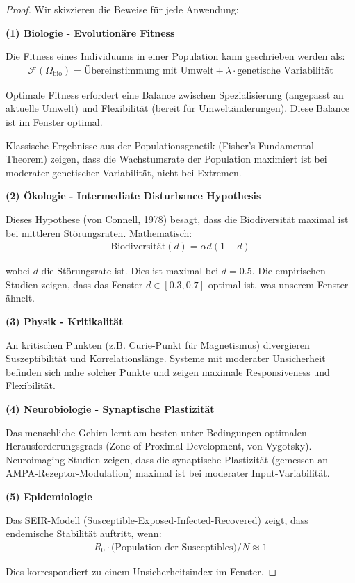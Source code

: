 \documentclass[a4paper, 12pt, twoside, openright]{report}
\theoremstyle{definition}
\theoremstyle{definition}
\begin{document}
\begin{proof}

Wir skizzieren die Beweise für jede Anwendung:

\textbf{(1) Biologie - Evolutionäre Fitness}

Die Fitness eines Individuums in einer Population kann geschrieben werden als:
\begin{align}
\mathcal{F}(\Omega_{\text{bio}}) = \text{Übereinstimmung mit Umwelt} + \lambda \cdot \text{genetische Variabilität}
\end{align}

Optimale Fitness erfordert eine Balance zwischen Spezialisierung (angepasst an aktuelle Umwelt) und Flexibilität (bereit für Umweltänderungen). Diese Balance ist im Fenster optimal.

Klassische Ergebnisse aus der Populationsgenetik (Fisher's Fundamental Theorem) zeigen, dass die Wachstumsrate der Population maximiert ist bei moderater genetischer Variabilität, nicht bei Extremen.

\textbf{(2) Ökologie - Intermediate Disturbance Hypothesis}

Dieses Hypothese (von Connell, 1978) besagt, dass die Biodiversität maximal ist bei mittleren Störungsraten. Mathematisch:
\begin{align}
\text{Biodiversität}(d) = \alpha d(1-d)
\end{align}

wobei $d$ die Störungsrate ist. Dies ist maximal bei $d = 0.5$. Die empirischen Studien zeigen, dass das Fenster $d \in [0.3, 0.7]$ optimal ist, was unserem Fenster ähnelt.

\textbf{(3) Physik - Kritikalität}

An kritischen Punkten (z.B. Curie-Punkt für Magnetismus) divergieren Suszeptibilität und Korrelationslänge. Systeme mit moderater Unsicherheit befinden sich nahe solcher Punkte und zeigen maximale Responsiveness und Flexibilität.

\textbf{(4) Neurobiologie - Synaptische Plastizität}

Das menschliche Gehirn lernt am besten unter Bedingungen optimalen Herausforderungsgrads (Zone of Proximal Development, von Vygotsky). Neuroimaging-Studien zeigen, dass die synaptische Plastizität (gemessen an AMPA-Rezeptor-Modulation) maximal ist bei moderater Input-Variabilität.

\textbf{(5) Epidemiologie}

Das SEIR-Modell (Susceptible-Exposed-Infected-Recovered) zeigt, dass endemische Stabilität auftritt, wenn:
\begin{align}
R_0 \cdot \text{(Population der Susceptibles)} / N \approx 1
\end{align}

Dies korrespondiert zu einem Unsicherheitsindex im Fenster.

\end{proof}
\end{document}
